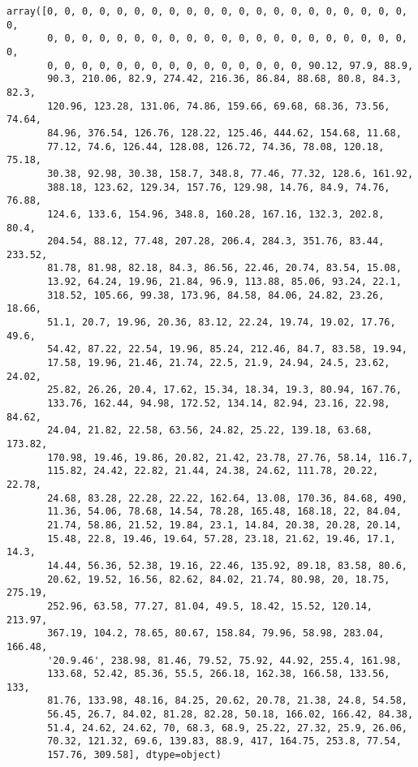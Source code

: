 \documentclass[11pt]{article}
\makeatletter
\newcommand{\boxspacing}{\kern\kvtcb@left@rule\kern\kvtcb@boxsep}
\newcommand{\prompt}[4]{
        \ttfamily\llap{{\color{#2}[#3]:\hspace{3pt}#4}}\vspace{-\baselineskip}
    }
\makeatother
\begin{document}
            \begin{tcolorbox}[breakable, size=fbox, boxrule=.5pt, pad at break*=1mm, opacityfill=0]
\prompt{Out}{outcolor}{0}{\boxspacing}
\begin{Verbatim}[commandchars=\\\{\}]
array([0, 0, 0, 0, 0, 0, 0, 0, 0, 0, 0, 0, 0, 0, 0, 0, 0, 0, 0, 0, 0, 0,
       0, 0, 0, 0, 0, 0, 0, 0, 0, 0, 0, 0, 0, 0, 0, 0, 0, 0, 0, 0, 0, 0,
       0, 0, 0, 0, 0, 0, 0, 0, 0, 0, 0, 0, 0, 0, 0, 90.12, 97.9, 88.9,
       90.3, 210.06, 82.9, 274.42, 216.36, 86.84, 88.68, 80.8, 84.3, 82.3,
       120.96, 123.28, 131.06, 74.86, 159.66, 69.68, 68.36, 73.56, 74.64,
       84.96, 376.54, 126.76, 128.22, 125.46, 444.62, 154.68, 11.68,
       77.12, 74.6, 126.44, 128.08, 126.72, 74.36, 78.08, 120.18, 75.18,
       30.38, 92.98, 30.38, 158.7, 348.8, 77.46, 77.32, 128.6, 161.92,
       388.18, 123.62, 129.34, 157.76, 129.98, 14.76, 84.9, 74.76, 76.88,
       124.6, 133.6, 154.96, 348.8, 160.28, 167.16, 132.3, 202.8, 80.4,
       204.54, 88.12, 77.48, 207.28, 206.4, 284.3, 351.76, 83.44, 233.52,
       81.78, 81.98, 82.18, 84.3, 86.56, 22.46, 20.74, 83.54, 15.08,
       13.92, 64.24, 19.96, 21.84, 96.9, 113.88, 85.06, 93.24, 22.1,
       318.52, 105.66, 99.38, 173.96, 84.58, 84.06, 24.82, 23.26, 18.66,
       51.1, 20.7, 19.96, 20.36, 83.12, 22.24, 19.74, 19.02, 17.76, 49.6,
       54.42, 87.22, 22.54, 19.96, 85.24, 212.46, 84.7, 83.58, 19.94,
       17.58, 19.96, 21.46, 21.74, 22.5, 21.9, 24.94, 24.5, 23.62, 24.02,
       25.82, 26.26, 20.4, 17.62, 15.34, 18.34, 19.3, 80.94, 167.76,
       133.76, 162.44, 94.98, 172.52, 134.14, 82.94, 23.16, 22.98, 84.62,
       24.04, 21.82, 22.58, 63.56, 24.82, 25.22, 139.18, 63.68, 173.82,
       170.98, 19.46, 19.86, 20.82, 21.42, 23.78, 27.76, 58.14, 116.7,
       115.82, 24.42, 22.82, 21.44, 24.38, 24.62, 111.78, 20.22, 22.78,
       24.68, 83.28, 22.28, 22.22, 162.64, 13.08, 170.36, 84.68, 490,
       11.36, 54.06, 78.68, 14.54, 78.28, 165.48, 168.18, 22, 84.04,
       21.74, 58.86, 21.52, 19.84, 23.1, 14.84, 20.38, 20.28, 20.14,
       15.48, 22.8, 19.46, 19.64, 57.28, 23.18, 21.62, 19.46, 17.1, 14.3,
       14.44, 56.36, 52.38, 19.16, 22.46, 135.92, 89.18, 83.58, 80.6,
       20.62, 19.52, 16.56, 82.62, 84.02, 21.74, 80.98, 20, 18.75, 275.19,
       252.96, 63.58, 77.27, 81.04, 49.5, 18.42, 15.52, 120.14, 213.97,
       367.19, 104.2, 78.65, 80.67, 158.84, 79.96, 58.98, 283.04, 166.48,
       '20.9.46', 238.98, 81.46, 79.52, 75.92, 44.92, 255.4, 161.98,
       133.68, 52.42, 85.36, 55.5, 266.18, 162.38, 166.58, 133.56, 133,
       81.76, 133.98, 48.16, 84.25, 20.62, 20.78, 21.38, 24.8, 54.58,
       56.45, 26.7, 84.02, 81.28, 82.28, 50.18, 166.02, 166.42, 84.38,
       51.4, 24.62, 24.62, 70, 68.3, 68.9, 25.22, 27.32, 25.9, 26.06,
       70.32, 121.32, 69.6, 139.83, 88.9, 417, 164.75, 253.8, 77.54,
       157.76, 309.58], dtype=object)
\end{Verbatim}
\end{tcolorbox}
        
\end{document}

